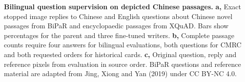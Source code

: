 \textbf{Bilingual question supervision on depicted Chinese passages.}
\textbf{a,} Exact stopped image replies to Chinese and English questions about Chinese novel passages from BiPaR and encyclopaedic passages from XQuAD. Bars show percentages for the parent and three fine-tuned writers. \textbf{b,} Complete passage counts require four answers for bilingual evaluations, both questions for CMRC and both requested orders for historical cards. \textbf{c,} Original question, reply and reference pixels from evaluation in source order. BiPaR questions and reference material are adapted from Jing, Xiong and Yan (2019) under CC BY-NC 4.0.
